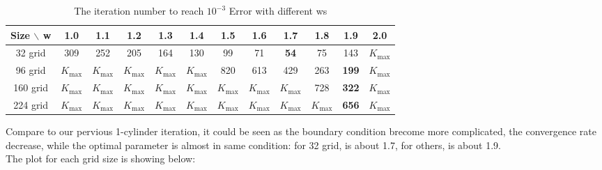 \documentclass[12pt]{article}
\begin{document}
\begin{table}[ht]
    \centering
    \begin{tabular}{cccccccccccc}
    \toprule
    Size $\backslash$ w & 1.0 & 1.1 & 1.2 & 1.3 & 1.4 & 1.5 & 1.6 & 1.7 & 1.8 & 1.9 & 2.0 \\
    \midrule
    32 grid & 309 & 252 & 205 & 164 & 130 & 99 & 71 & \textbf{54} & 75 & 143 &  \( K_{\text{max}} \)   \\
    96 grid & \( K_{\text{max}} \) & \( K_{\text{max}} \) & \( K_{\text{max}} \) & \( K_{\text{max}} \) & \( K_{\text{max}} \) & 820 & 613 & 429 & 263 & \textbf{199} & \( K_{\text{max}} \) \\
    160 grid & \( K_{\text{max}} \) & \( K_{\text{max}} \) & \( K_{\text{max}} \) & \( K_{\text{max}} \) & \( K_{\text{max}} \) & \( K_{\text{max}} \) & \( K_{\text{max}} \) & \( K_{\text{max}} \) & 728 & \textbf{322} & \( K_{\text{max}} \) \\
    224 grid & \( K_{\text{max}} \) & \( K_{\text{max}} \) &  \( K_{\text{max}} \) & \( K_{\text{max}} \) & \( K_{\text{max}} \) & \( K_{\text{max}} \) & \( K_{\text{max}} \) & \( K_{\text{max}} \) & \( K_{\text{max}} \) & \textbf{656} & \( K_{\text{max}} \) \\
    \bottomrule
    \end{tabular}
    \caption{The iteration number to reach $10^{-3}$ Error with different ws}
    \label{tab:my_label}
\end{table}




Compare to our pervious 1-cylinder iteration, it could be seen as the boundary condition
brecome more complicated, the convergence rate decrease, while the optimal parameter
is almost in same condition: for 32 grid, is about 1.7, for others, is about 1.9.\\



The plot for each grid size is showing below:
\end{document}
